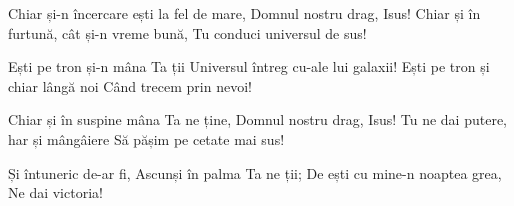 \beginverse
Chiar și-n încercare ești la fel de mare,
Domnul nostru drag, Isus!
Chiar și în furtună, cât și-n vreme bună,
Tu conduci universul de sus!
\endverse

\beginchorus
Ești pe tron și-n mâna Ta ții
Universul întreg cu-ale lui galaxii!
Ești pe tron și chiar lângă noi
Când trecem prin nevoi!
\endchorus

\beginverse
Chiar și în suspine mâna Ta ne ține,
Domnul nostru drag, Isus!
Tu ne dai putere, har și mângâiere
Să pășim pe cetate mai sus!
\endverse

\beginverse*
Și întuneric de-ar fi,
Ascunși în palma Ta ne ții;
De ești cu mine-n noaptea grea,
Ne dai victoria!
\endverse
\endsong